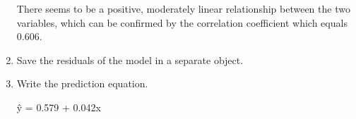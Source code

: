 \documentclass[12pt,letterpaper]{article}
\begin{document}
\begin{enumerate}
		 
		
		There seems to be a positive, moderately linear relationship between the two variables, which can be confirmed by the correlation coefficient which equals 0.606.
		
		\item Save the residuals of the model in a separate object.	
		
		 
		
		\item Write the prediction equation.
		
		\^{y} = 0.579 + 0.042x
		
	\end{enumerate}
\end{document}
